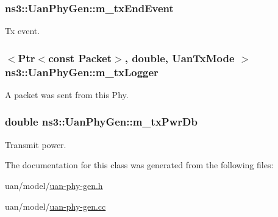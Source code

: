 \subsubsection[{\texorpdfstring{m\+\_\+tx\+End\+Event}{m_txEndEvent}}]{ ns3\+::\+Uan\+Phy\+Gen\+::m\+\_\+tx\+End\+Event\hspace{0.3cm}{\ttfamily [private]}}\hypertarget{classns3_1_1UanPhyGen_a98ff1f294850555c8e8d41b23e39306a}{}\label{classns3_1_1UanPhyGen_a98ff1f294850555c8e8d41b23e39306a}


Tx event. 

\subsubsection[{\texorpdfstring{m\+\_\+tx\+Logger}{m_txLogger}}]{$<${\bf Ptr}$<$const {\bf Packet}$>$, double, {\bf Uan\+Tx\+Mode} $>$ ns3\+::\+Uan\+Phy\+Gen\+::m\+\_\+tx\+Logger\hspace{0.3cm}{\ttfamily [private]}}\hypertarget{classns3_1_1UanPhyGen_a18fa0133aac0f1187120ab09243b25e3}{}\label{classns3_1_1UanPhyGen_a18fa0133aac0f1187120ab09243b25e3}
A packet was sent from this Phy. 
\subsubsection[{\texorpdfstring{m\+\_\+tx\+Pwr\+Db}{m_txPwrDb}}]{\setlength{\rightskip}{0pt plus 5cm}double ns3\+::\+Uan\+Phy\+Gen\+::m\+\_\+tx\+Pwr\+Db\hspace{0.3cm}{\ttfamily [private]}}\hypertarget{classns3_1_1UanPhyGen_a8d21ce8d4968ac89d118da47530f7428}{}\label{classns3_1_1UanPhyGen_a8d21ce8d4968ac89d118da47530f7428}


Transmit power. 



The documentation for this class was generated from the following files\+:\begin{DoxyCompactItemize}
\item 
uan/model/\hyperlink{uan-phy-gen_8h}{uan-\/phy-\/gen.\+h}\item 
uan/model/\hyperlink{uan-phy-gen_8cc}{uan-\/phy-\/gen.\+cc}\end{DoxyCompactItemize}
